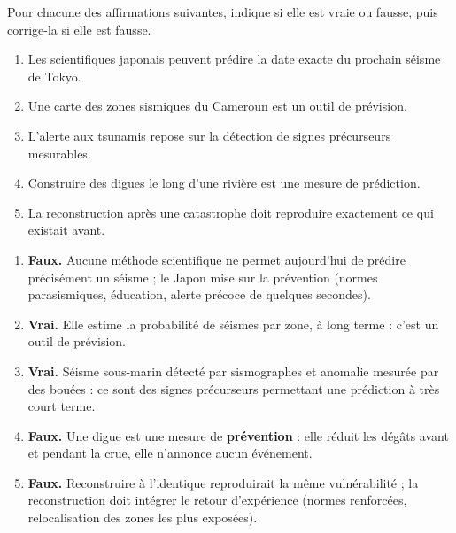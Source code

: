\documentclass[11pt]{article}
\begin{document}
\begin{exercice}
Pour chacune des affirmations suivantes, indique si elle est vraie ou fausse, puis corrige-la si elle est fausse.
\begin{enumerate}
\item Les scientifiques japonais peuvent prédire la date exacte du prochain séisme de Tokyo.
\item Une carte des zones sismiques du Cameroun est un outil de prévision.
\item L'alerte aux tsunamis repose sur la détection de signes précurseurs mesurables.
\item Construire des digues le long d'une rivière est une mesure de prédiction.
\item La reconstruction après une catastrophe doit reproduire exactement ce qui existait avant.
\end{enumerate}
\end{exercice}

\begin{corrige}
\begin{enumerate}
\item \textbf{Faux.} Aucune méthode scientifique ne permet aujourd'hui de prédire précisément un séisme ; le Japon mise sur la prévention (normes parasismiques, éducation, alerte précoce de quelques secondes).
\item \textbf{Vrai.} Elle estime la probabilité de séismes par zone, à long terme : c'est un outil de prévision.
\item \textbf{Vrai.} Séisme sous-marin détecté par sismographes et anomalie mesurée par des bouées : ce sont des signes précurseurs permettant une prédiction à très court terme.
\item \textbf{Faux.} Une digue est une mesure de \textbf{prévention} : elle réduit les dégâts avant et pendant la crue, elle n'annonce aucun événement.
\item \textbf{Faux.} Reconstruire à l'identique reproduirait la même vulnérabilité ; la reconstruction doit intégrer le retour d'expérience (normes renforcées, relocalisation des zones les plus exposées).
\end{enumerate}
\end{corrige}
\end{document}
